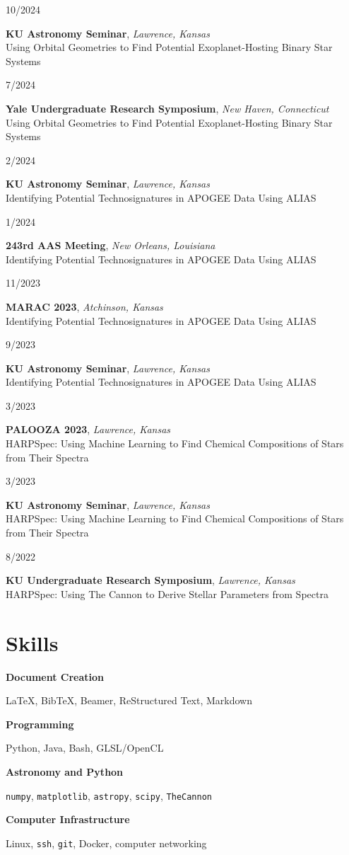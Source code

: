 \documentclass[12pt]{article}
\begin{document}
\newcommand{\talk}[4]{
  \medskip
  \begin{minipage}[t]{0.75in}
    #3
  \end{minipage}
  \begin{minipage}[t]{\dimexpr\textwidth-0.75in}
    \textbf{#1}, \textit{#2}\\
    #4
  \end{minipage}  
}

\talk{KU Astronomy Seminar}{Lawrence, Kansas}{10/2024}{Using Orbital Geometries to Find Potential Exoplanet-Hosting Binary Star Systems}

\talk{Yale Undergraduate Research Symposium}{New Haven, Connecticut}{7/2024}{Using Orbital Geometries to Find Potential Exoplanet-Hosting Binary Star Systems}

\talk{KU Astronomy Seminar}{Lawrence, Kansas}{2/2024}{Identifying Potential Technosignatures in APOGEE Data Using ALIAS}

\talk{243rd AAS Meeting}{New Orleans, Louisiana}{1/2024}{Identifying Potential Technosignatures in APOGEE Data Using ALIAS}

\talk{MARAC 2023}{Atchinson, Kansas}{11/2023}{Identifying Potential Technosignatures in APOGEE Data Using ALIAS}

\talk{KU Astronomy Seminar}{Lawrence, Kansas}{9/2023}{Identifying Potential Technosignatures in APOGEE Data Using ALIAS}

\talk{PALOOZA 2023}{Lawrence, Kansas}{3/2023}{HARPSpec: Using Machine Learning to Find Chemical Compositions of Stars from Their Spectra}

\talk{KU Astronomy Seminar}{Lawrence, Kansas}{3/2023}{HARPSpec: Using Machine Learning to Find Chemical Compositions of Stars from Their Spectra}

\talk{KU Undergraduate Research Symposium}{Lawrence, Kansas}{8/2022}{HARPSpec: Using The Cannon to Derive Stellar Parameters from Spectra}


\newcommand{\skills}[2]{
  \begin{minipage}[t]{2in}
    \textbf{#1}
  \end{minipage}
  \begin{minipage}[t]{\dimexpr\textwidth-2in}
    #2
  \end{minipage}  
}

\section*{Skills}\vspace{-1ex}


\skills{Document Creation}{LaTeX, BibTeX, Beamer, ReStructured Text, Markdown}
\skills{Programming}{Python, Java, Bash, GLSL/OpenCL}
\skills{Astronomy and Python}{\texttt{numpy}, \texttt{matplotlib}, \texttt{astropy}, \texttt{scipy}, \texttt{TheCannon}}
\skills{Computer Infrastructure}{Linux, \texttt{ssh}, \texttt{git}, Docker, computer networking}
\end{document}
